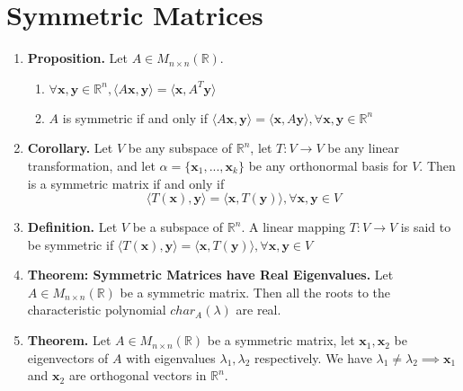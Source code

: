 \documentclass[oneside, 12pt]{book}
\newcommand{\settag}[1]{\renewcommand{\theenumi}{#1}}
\newcommand{\R}{\mathbb{R}}
\newcommand{\tbf}[1]{\textbf{#1}}
\newcommand{\trans}[3]{$#1:#2\rightarrow{}#3$}
\newcommand{\map}[3]{\text{$\left[#1\right]_{#2}^{#3}$}}
\newcommand{\mat}[2]{M_{#1 \times #2}(\R)}
\newcommand{\para}[1]{\item \tbf{#1}}
\newcommand{\vx}{\mathbf{x}}
\newcommand{\vy}{\mathbf{y}}
\begin{document}
\section{Symmetric Matrices}
\begin{enumerate}
    \settag{4.5.2a}
    \para{Proposition.} Let $A \in \mat{n}{n}$.
    \begin{enumerate}
        \item $\forall \vx,\vy \in \R^n, \langle A\vx,\vy\rangle = \langle \vx, A^T\vy\rangle$
        \item $A$ is symmetric if and only if $\langle A\vx,\vy\rangle = \langle \vx,A\vy 
        \rangle, \forall \vx, \vy \in \R^n$
    \end{enumerate}
    
    \settag{4.5.2b}
    \para{Corollary.} Let $V$ be any subspace of $\R^n$, let \trans{T}{V}{V} be any linear 
    transformation, and let $\alpha = \{\vx_1,...,\vx_k\}$ be any orthonormal basis for $V$. 
    Then \map{T}{\alpha}{\alpha} is a symmetric matrix if and only if $$\langle T(\vx), 
    \vy\rangle = \langle \vx,T(\vy)\rangle, \forall \vx, \vy \in V$$
    
    \settag{4.5.3}
    \para{Definition.} Let $V$ be a subspace of $\R^n$. A linear mapping \trans{T}{V}{V} 
    is said to be symmetric if $\langle T(\vx),\vy\rangle = \langle \vx, T(\vy) \rangle, \forall \vx, \vy \in V$
    
    \settag{4.5.6}
    \para{Theorem: Symmetric Matrices have Real Eigenvalues.} Let $A \in \mat{n}{n}$ be a 
    symmetric matrix. Then all the roots to the characteristic polynomial $char_A(\lambda)$ are real.
    
    \settag{4.5.7}
    \para{Theorem.} Let $A \in \mat{n}{n}$ be a symmetric matrix, let $\vx_1, \vx_2$ be 
    eigenvectors of $A$ with eigenvalues $\lambda_1, \lambda_2$ respectively. We have 
    $\lambda_1 \neq \lambda_2 \implies \vx_1$ and $\vx_2$ are orthogonal vectors in $\R^n$.
\end{enumerate}
\end{document}

